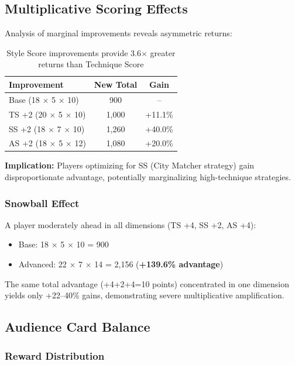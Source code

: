 \documentclass[11pt,a4paper]{article}
\begin{document}
\subsection{Multiplicative Scoring Effects}

Analysis of marginal improvements reveals asymmetric returns:

\begin{table}[H]
\centering
\begin{tabular}{lcc}
\toprule
\textbf{Improvement} & \textbf{New Total} & \textbf{Gain} \\
\midrule
Base (18 $\times$ 5 $\times$ 10) & 900 & -- \\
TS +2 (20 $\times$ 5 $\times$ 10) & 1,000 & +11.1\% \\
SS +2 (18 $\times$ 7 $\times$ 10) & 1,260 & +40.0\% \\
AS +2 (18 $\times$ 5 $\times$ 12) & 1,080 & +20.0\% \\
\bottomrule
\end{tabular}
\caption{Style Score improvements provide 3.6$\times$ greater returns than Technique Score}
\end{table}

\textbf{Implication:} Players optimizing for SS (City Matcher strategy) gain disproportionate advantage, potentially marginalizing high-technique strategies.

\subsubsection{Snowball Effect}

A player moderately ahead in all dimensions (TS +4, SS +2, AS +4):

\begin{itemize}[itemsep=0pt]
    \item Base: 18 $\times$ 5 $\times$ 10 = 900
    \item Advanced: 22 $\times$ 7 $\times$ 14 = 2,156 (\textbf{+139.6\% advantage})
\end{itemize}

The same total advantage (+4+2+4=10 points) concentrated in one dimension yields only +22--40\% gains, demonstrating severe multiplicative amplification.

\subsection{Audience Card Balance}

\subsubsection{Reward Distribution}
\end{document}
